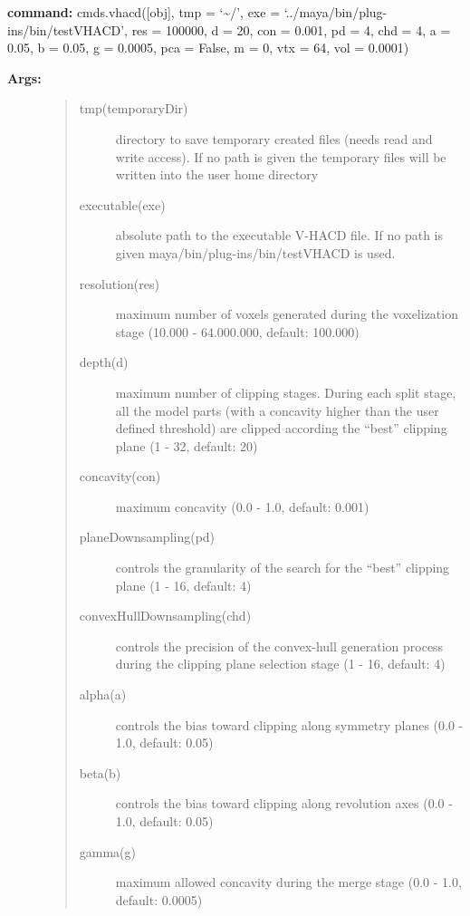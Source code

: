 \documentclass[letterpaper,10pt,english]{sphinxmanual}
\begin{document}
\textbf{command:} cmds.vhacd({[}obj{]}, tmp = `\textasciitilde{}/', exe = `../maya/bin/plug-ins/bin/testVHACD', res = 100000, d = 20, con = 0.001, pd = 4, chd = 4, a = 0.05, b = 0.05, g = 0.0005, pca = False, m = 0, vtx = 64, vol = 0.0001)
\begin{description}
\item[{\textbf{Args:}}] \leavevmode\begin{quote}\begin{description}
\item[{tmp(temporaryDir)}] \leavevmode
directory to save temporary created files (needs read and write access). If no path is given the temporary files will be written into the user home directory

\item[{executable(exe)}] \leavevmode
absolute path to the executable V-HACD file. If no path is given maya/bin/plug-ins/bin/testVHACD is used.

\item[{resolution(res)}] \leavevmode
maximum number of voxels generated during the voxelization stage (10.000 - 64.000.000, default: 100.000)

\item[{depth(d)}] \leavevmode
maximum number of clipping stages. During each split stage, all the model parts (with a concavity higher than the user defined threshold) are clipped according the ``best'' clipping plane (1 - 32, default: 20)

\item[{concavity(con)}] \leavevmode
maximum concavity (0.0 - 1.0, default: 0.001)

\item[{planeDownsampling(pd)}] \leavevmode
controls the granularity of the search for the ``best'' clipping plane (1 - 16, default: 4)

\item[{convexHullDownsampling(chd)}] \leavevmode
controls the precision of the convex-hull generation process during the clipping plane selection stage (1 - 16, default: 4)

\item[{alpha(a)}] \leavevmode
controls the bias toward clipping along symmetry planes (0.0 - 1.0, default: 0.05)

\item[{beta(b)}] \leavevmode
controls the bias toward clipping along revolution axes (0.0 - 1.0, default: 0.05)

\item[{gamma(g)}] \leavevmode
maximum allowed concavity during the merge stage (0.0 - 1.0, default: 0.0005)


\end{description}
\end{quote}
\end{description}
\end{document}

